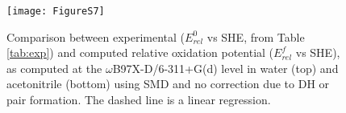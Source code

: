 \documentclass[11pt,a4paper]{article}
\begin{document}
\begin{figure}[!h]
	\centering
	\texttt{[image: FigureS7]}
	\caption{Comparison between experimental ($E^0_{rel} $ vs SHE, from Table \ref{tab:exp}) and computed relative oxidation potential ($E^f_{rel}$ vs SHE), as computed at the $\omega$B97X-D/6-311+G(d) level in water (top) and acetonitrile (bottom) using SMD and no correction due to DH or pair formation.  The dashed line is a linear regression.}
	\label{fig:expvstheo}
\end{figure}

\clearpage



 

	
\end{document}
